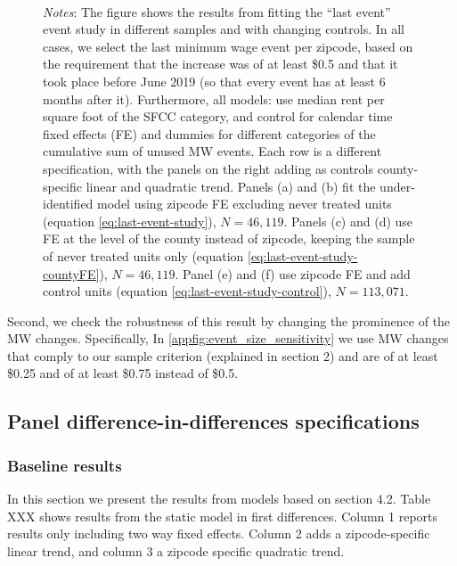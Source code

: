 \begin{figure}[h!]
\begin{subfigure}{0.5\textwidth}
        \end{subfigure}\\
        \begin{minipage}{.95\textwidth} \footnotesize
			\vspace{2mm} 
			\textit{Notes}: The figure shows the results from fitting the ``last event'' event study in different samples and with changing controls. In all cases, we select the last minimum wage event per zipcode, based on the requirement that the increase was of at least \$0.5 and that it took place before June 2019 (so that every event has at least 6 months after it). Furthermore, all models: use median rent per square foot of the SFCC category, and control for calendar time fixed effects (FE) and dummies for different categories of the cumulative sum of unused MW events. Each row is a different specification, with the panels on the right adding as controls county-specific linear and quadratic trend. Panels (a) and (b) fit the under-identified model using zipcode FE excluding never treated units (equation \ref{eq:last-event-study}), $N = 46,119$. Panels (c) and (d) use FE at the level of the county instead of zipcode, keeping the sample of never treated units only (equation \ref{eq:last-event-study-countyFE}), $N = 46,119$. Panel (e) and (f) use zipcode FE and add control units (equation \ref{eq:last-event-study-control}), $N = 113,071$.
		\end{minipage}
    \end{figure}
    
    
    
    
    Second, we check the robustness of this result by changing the prominence of the MW changes. Specifically, In \ref{appfig:event_size_sensitivity} we use MW changes that comply to our sample criterion (explained in section 2) and are of at least \$0.25 and of at least \$0.75 instead of \$0.5.
    
    
    
\subsection{Panel difference-in-differences specifications}\label{subsec:results/first-differences}

    \subsubsection{Baseline results}
    
    In this section we present the results from models based on section 4.2. Table XXX shows results from the static model in first differences. Column 1 reports results only including two way fixed effects. Column 2 adds a zipcode-specific linear trend, and column 3 a zipcode specific quadratic trend. 
    
